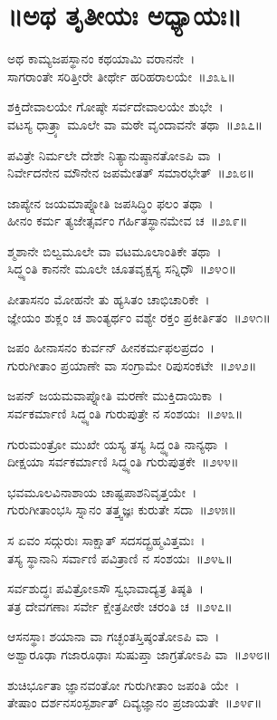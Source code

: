 \section{॥ಅಥ ತೃತೀಯಃ ಅಧ್ಯಾಯಃ॥}

ಅಥ ಕಾಮ್ಯಜಪಸ್ಥಾನಂ ಕಥಯಾಮಿ ವರಾನನೇ~।\\
ಸಾಗರಾಂತೇ ಸರಿತ್ತೀರೇ ತೀರ್ಥೇ ಹರಿಹರಾಲಯೇ~॥೨೩೬॥

ಶಕ್ತಿದೇವಾಲಯೇ ಗೋಷ್ಠೇ ಸರ್ವದೇವಾಲಯೇ ಶುಭೇ~।\\
ವಟಸ್ಯ ಧಾತ್ರ್ಯಾ ಮೂಲೇ ವಾ ಮಠೇ ವೃಂದಾವನೇ ತಥಾ~॥೨೩೭॥

ಪವಿತ್ರೇ ನಿರ್ಮಲೇ ದೇಶೇ ನಿತ್ಯಾನುಷ್ಠಾನತೋಽಪಿ ವಾ~।\\
ನಿರ್ವೇದನೇನ ಮೌನೇನ ಜಪಮೇತತ್ ಸಮಾರಭೇತ್~॥೨೩೮॥

ಜಾಪ್ಯೇನ ಜಯಮಾಪ್ನೋತಿ ಜಪಸಿದ್ಧಿಂ ಫಲಂ ತಥಾ~।\\
ಹೀನಂ ಕರ್ಮ ತ್ಯಜೇತ್ಸರ್ವಂ ಗರ್ಹಿತಸ್ಥಾನಮೇವ ಚ~॥೨೩೯॥

ಶ್ಮಶಾನೇ ಬಿಲ್ವಮೂಲೇ ವಾ ವಟಮೂಲಾಂತಿಕೇ ತಥಾ~।\\
ಸಿದ್ಧ್ಯಂತಿ ಕಾನನೇ ಮೂಲೇ ಚೂತವೃಕ್ಷಸ್ಯ ಸನ್ನಿಧೌ~॥೨೪೦॥

ಪೀತಾಸನಂ ಮೋಹನೇ ತು ಹ್ಯಸಿತಂ ಚಾಭಿಚಾರಿಕೇ~।\\
ಜ್ಞೇಯಂ ಶುಕ್ಲಂ ಚ ಶಾಂತ್ಯರ್ಥಂ ವಶ್ಯೇ ರಕ್ತಂ ಪ್ರಕೀರ್ತಿತಂ~॥೨೪೧॥

ಜಪಂ ಹೀನಾಸನಂ ಕುರ್ವನ್ ಹೀನಕರ್ಮಫಲಪ್ರದಂ~।\\
ಗುರುಗೀತಾಂ ಪ್ರಯಾಣೇ ವಾ ಸಂಗ್ರಾಮೇ ರಿಪುಸಂಕಟೇ~॥೨೪೨॥

ಜಪನ್ ಜಯಮವಾಪ್ನೋತಿ ಮರಣೇ ಮುಕ್ತಿದಾಯಿಕಾ~।\\
ಸರ್ವಕರ್ಮಾಣಿ ಸಿದ್ಧ್ಯಂತಿ ಗುರುಪುತ್ರೇ ನ ಸಂಶಯಃ~॥೨೪೩॥

ಗುರುಮಂತ್ರೋ ಮುಖೇ ಯಸ್ಯ ತಸ್ಯ ಸಿದ್ಧ್ಯಂತಿ ನಾನ್ಯಥಾ~।\\
ದೀಕ್ಷಯಾ ಸರ್ವಕರ್ಮಾಣಿ ಸಿದ್ಧ್ಯಂತಿ ಗುರುಪುತ್ರಕೇ~॥೨೪೪॥

ಭವಮೂಲವಿನಾಶಾಯ ಚಾಷ್ಟಪಾಶನಿವೃತ್ತಯೇ~।\\
ಗುರುಗೀತಾಂಭಸಿ ಸ್ನಾನಂ ತತ್ತ್ವಜ್ಞಃ ಕುರುತೇ ಸದಾ~॥೨೪೫॥

ಸ ಏವಂ ಸದ್ಗುರುಃ ಸಾಕ್ಷಾತ್ ಸದಸದ್ಬ್ರಹ್ಮವಿತ್ತಮಃ~।\\
ತಸ್ಯ ಸ್ಥಾನಾನಿ ಸರ್ವಾಣಿ ಪವಿತ್ರಾಣಿ ನ ಸಂಶಯಃ~॥೨೪೬॥

ಸರ್ವಶುದ್ಧಃ ಪವಿತ್ರೋಽಸೌ ಸ್ವಭಾವಾದ್ಯತ್ರ ತಿಷ್ಠತಿ~।\\
ತತ್ರ ದೇವಗಣಾಃ ಸರ್ವೇ ಕ್ಷೇತ್ರಪೀಠೇ ಚರಂತಿ ಚ~॥೨೪೭॥

ಆಸನಸ್ಥಾಃ ಶಯಾನಾ ವಾ ಗಚ್ಛಂತಸ್ತಿಷ್ಠಂತೋಽಪಿ ವಾ~।\\
ಅಶ್ವಾರೂಢಾ ಗಜಾರೂಢಾಃ ಸುಷುಪ್ತಾ ಜಾಗ್ರತೋಽಪಿ ವಾ~॥೨೪೮॥

ಶುಚಿರ್ಭೂತಾ ಜ್ಞಾನವಂತೋ ಗುರುಗೀತಾಂ ಜಪಂತಿ ಯೇ~।\\
ತೇಷಾಂ ದರ್ಶನಸಂಸ್ಪರ್ಶಾತ್ ದಿವ್ಯಜ್ಞಾನಂ ಪ್ರಜಾಯತೇ~॥೨೪೯॥

